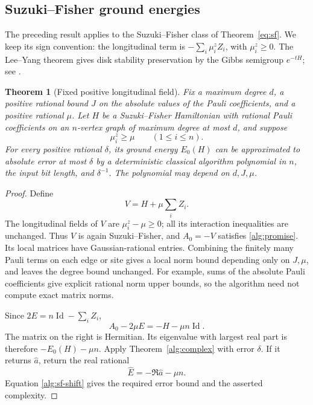 \documentclass[reqno]{amsart}
\newtheorem{theorem}{Theorem}[section]
\theoremstyle{definition}
\theoremstyle{remark}
\DeclareMathOperator{\Id}{Id}
\begin{document}
\subsection{Suzuki--Fisher ground energies}
\label{alg:sf-subsection}

The preceding result applies to the Suzuki--Fisher class of
Theorem~\ref{eq:sf}.  We keep its sign convention:
the longitudinal term is
\(-\sum_i\mu_i^z Z_i\), with \(\mu_i^z\ge0\).
The Lee--Yang theorem gives disk stability preservation by the
Gibbs semigroup \(e^{-tH}\); see
\cite{SuzukiFisher71,WBG26,BGLW26}.

\begin{theorem}[Fixed positive longitudinal field]
\label{alg:sf}
Fix a maximum degree \(d\), a positive rational bound \(J\) on
the absolute values of the Pauli coefficients, and a positive
rational \(\mu\).
Let \(H\) be a Suzuki--Fisher Hamiltonian with rational Pauli
coefficients on an \(n\)-vertex graph of maximum degree at most
\(d\), and suppose
\[
 \mu_i^z\ge\mu\qquad(1\le i\le n).
 \]
For every positive rational \(\delta\), its ground energy
\(E_0(H)\) can be approximated to absolute error at most
\(\delta\) by a deterministic classical algorithm polynomial in
\(n\), the input bit length, and \(\delta^{-1}\).
The polynomial may depend on \(d,J,\mu\).
\end{theorem}

\begin{proof}
Define
\[
 V=H+\mu\sum_i Z_i.
 \]
The longitudinal fields of \(V\) are \(\mu_i^z-\mu\ge0\);
all its interaction inequalities are unchanged.
Thus \(V\) is again Suzuki--Fisher, and
\(A_0=-V\) satisfies \eqref{alg:promise}.
Its local matrices have Gaussian-rational entries.
Combining the finitely many Pauli terms on each edge or site
gives a local norm bound depending only on \(J,\mu\), and leaves
the degree bound unchanged.
For example, sums of the absolute Pauli coefficients give
explicit rational norm upper bounds, so the algorithm need not
compute exact matrix norms.

Since \(2E=n\Id-\sum_i Z_i\),
\begin{equation}
 A_0-2\mu E=-H-\mu n\Id.
 \label{alg:sf-shift}
\end{equation}
The matrix on the right is Hermitian.  Its eigenvalue with
largest real part is therefore
\(-E_0(H)-\mu n\).
Apply Theorem~\ref{alg:complex} with error \(\delta\).
If it returns \(\widehat a\), return the real rational
\[
 \widehat E=-\Re\widehat a-\mu n.
 \]
Equation \eqref{alg:sf-shift} gives the required error bound
and the asserted complexity.
\end{proof}
\end{document}
